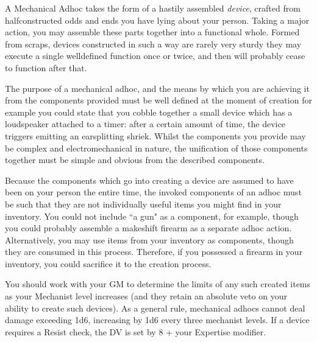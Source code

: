{
	A Mechanical Ad\minus{}hoc takes the form of a hastily assembled {\it device}, crafted from half\minus{}constructed odds and ends you have lying about your person. Taking a major action, you may assemble these parts together into a functional whole. Formed from scraps, devices constructed in such a way are rarely very sturdy \minus{} they may execute a single well\minus{}defined function once or twice, and then will probably cease to function after that. 
	
	The purpose of a mechanical ad\minus{}hoc, and the means by which you are achieving it from the components provided must be well defined at the moment of creation \minus{} for example you could state that you cobble together a small device which has a loudspeaker attached to a timer: after a certain amount of time, the device triggers emitting an earsplitting shriek. Whilst the components you provide may be complex and electromechanical in nature, the unification of those components together must be simple and obvious from the described components.
	
	Because the components which go into creating a device are assumed to have been on your person the entire time, the invoked components of an ad\minus{}hoc must be such that they are not individually useful items you might find in your inventory. You could not include ``a gun" as a component, for example, though you could probably assemble a makeshift firearm as a separate ad\minus{}hoc action. Alternatively, you may use items from your inventory as components, though they are consumed in this process. Therefore, if you possessed a firearm in your inventory, you could sacrifice it to the creation process. 
	
	You should work with your GM to determine the limits of any such created items as your Mechanist level increases (and they retain an absolute veto on your ability to create such devices). As a general rule, mechanical ad\minus{}hocs cannot deal damage exceeding 1d6, increasing by 1d6 every three mechanist levels. If a device requires a Resist check, the DV is set by 8 + your Expertise modifier. 
	
}

